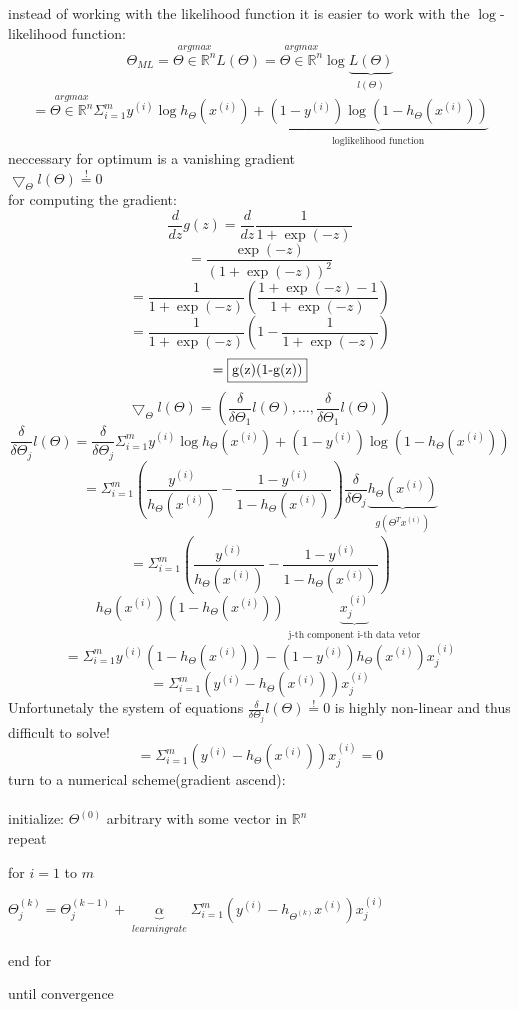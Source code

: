 instead of working with the likelihood function it is easier to work with the $\log$-likelihood function:
\[\Theta_{ML} = \stackrel{argmax}{\Theta \in \mathbb{R}^n} L(\Theta) = \stackrel{argmax}{\Theta \in \mathbb{R}^n} \log \underbrace{L(\Theta)}_{\substack{l(\Theta)}}\]
\[= \stackrel{argmax}{\Theta \in \mathbb{R}^n} \Sigma^m_{i=1} y^{(i)} \log h_{\Theta}(x^{(i)}) + \underbrace{(1-y^{(i)}) \log(1-h_{\Theta}(x^{(i)}))}_{\substack{\log \text{likelihood function}}}\]
neccessary for optimum is a vanishing gradient\\
$\bigtriangledown_{\Theta} l(\Theta) \stackrel{!}{=}0$\\
for computing the gradient:
\[\frac{d}{dz} g(z) = \frac{d}{dz} \frac{1}{1+\exp(-z)}\]
\[= \frac{\exp(-z)}{(1+ \exp (-z))^2}\]
\[= \frac{1}{1+\exp (-z)} (\frac{1+\exp(-z) -1}{1+\exp(-z)})\]
\[= \frac{1}{1+\exp(-z)} (1-\frac{1}{1+\exp(-z)})\]
\[= \framebox{g(z)(1-g(z))}\]
\newline
\[\bigtriangledown_{\Theta} l(\Theta) = (\frac{\delta}{\delta \Theta_1} l(\Theta), \dots , \frac{\delta}{\delta \Theta_1} l(\Theta))\]
\[\frac{\delta}{\delta \Theta_j} l(\Theta)= \frac{\delta}{\delta \Theta_j} \Sigma^m_{i=1} y^{(i)}\log h_\Theta(x^{(i)}) + (1-y^{(i)}) \log (1-h_\Theta(x^{(i)}))\]
\[= \Sigma^m_{i=1} \left( \frac{y^{(i)}}{h_\Theta(x^{(i)})} - \frac{1-y^{(i)}}{1-h_\Theta(x^{(i)})}\right) \frac{\delta}{\delta\Theta_j} \underbrace{h_\Theta(x^{(i)})}_{\substack{g(\Theta^Tx^{(i)})}}\]
\[=\Sigma^m_{i=1} \left( \frac{y^{(i)}}{h_\Theta(x^{(i)})} - \frac{1-y^{(i)}}{1-h_\Theta(x^{(i)})}\right)\]
\[h_\Theta(x^{(i)})(1-h_\Theta(x^{(i)}))\underbrace{x^{(i)}_j}_{\substack{\text{j-th component i-th data vetor}}}\]
\[= \Sigma^m_{i=1} y^{(i)}(1-h_\Theta(x^{(i)}))-(1-y^{(i)})h_\Theta(x^{(i)})x^{(i)}_j\]
\[= \Sigma^m_{i=1}( y^{(i)}-h_\Theta(x^{(i)}))x^{(i)}_j\]
Unfortunetaly the system of equations $\frac{\delta}{\delta\Theta_j} l(\Theta)\stackrel{!}{=}0$ is highly non-linear and thus difficult to solve!
\[= \Sigma^m_{i=1}( y^{(i)}-h_\Theta(x^{(i)}))x^{(i)}_j = 0\]
turn to a numerical scheme(gradient ascend):\\\\
initialize: $\Theta^{(0)}$ arbitrary with some vector in $\mathbb{R}^n$\\
repeat
\begin{addmargin}[2 cm]{0 cm}
for $i=1$ to $m$
\begin{addmargin}[2 cm]{0 cm}
$\Theta_j^{(k)} = \Theta^{(k-1)}_j + \underbrace{\alpha}_{\substack{learning rate}} \Sigma^m_{i=1}(y^{(i)} - h_{\Theta^{(k)}} x^{(i)})x_j^{(i)}$
\end{addmargin}
end for
\end{addmargin}
until convergence

